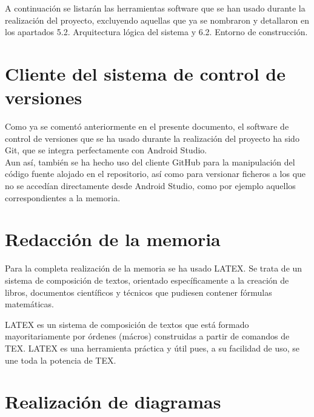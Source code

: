 

A continuación se listarán las herramientas software que se han usado durante la realización del proyecto, excluyendo aquellas que ya se nombraron y detallaron en los apartados 5.2. Arquitectura lógica del sistema y 6.2. Entorno de construcción.

\section{Cliente del sistema de control de versiones}

Como ya se comentó anteriormente en el presente documento, el software de control de versiones que se ha usado durante la realización del proyecto ha sido Git, que se integra perfectamente con Android Studio.\\

Aun así, también se ha hecho uso del cliente GitHub para la manipulación del código fuente alojado en el repositorio, así como para versionar ficheros a los que no se accedían directamente desde Android Studio, como por ejemplo aquellos correspondientes a la memoria.


\section{Redacción de la memoria}

Para la completa realización de la memoria se ha usado LATEX. Se trata de un sistema de composición de textos, orientado específicamente a la creación de libros, documentos científicos y técnicos que pudiesen contener fórmulas matemáticas.\\


LATEX es un sistema de composición de textos que está formado mayoritariamente por órdenes (mácros) construidas a partir de comandos de TEX. LATEX es una herramienta práctica y útil pues, a su facilidad de uso, se une toda la potencia de TEX.

\section{Realización de diagramas}

